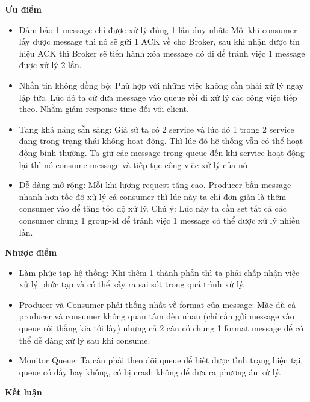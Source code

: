             \textbf{Ưu điểm}
            
            \begin{itemize}
                \item Đảm bảo 1 message chỉ được xử lý đúng 1 lần duy nhất: Mỗi khi consumer lấy được message thì nó sẽ gửi 1 ACK về cho Broker, sau khi nhận được tín hiệu ACK thì Broker sẽ tiến hành xóa message đó đi để tránh việc 1 message được xử lý 2 lần.
                \item Nhắn tin không đồng bộ: Phù hợp với những việc không cần phải xử lý ngay lập tức. Lúc đó ta cứ đưa message vào queue rồi đi xử lý các công việc tiếp theo. Nhằm giảm response time đối với client.
                \item Tăng khả năng sẵn sàng: Giả sử ta có 2 service và lúc đó 1 trong 2 service đang trong trạng thái không hoạt động. Thì lúc đó hệ thống vẫn có thể hoạt động bình thường. Ta giữ các message trong queue đến khi service hoạt động lại thì nó consume message và tiếp tục công việc xử lý của nó
                \item Dễ dàng mở rộng: Mỗi khi lượng request tăng cao. Producer bắn message nhanh hơn tốc độ xử lý cả consumer thì lúc này ta chỉ đơn giản là thêm consumer vào để tăng tốc độ xử lý. Chú ý: Lúc này ta cần set tất cả các consumer chung 1 group-id để tránh việc 1 message có thể được xử lý nhiều lần.
            \end{itemize}
            
            \textbf{Nhược điểm}
            
            \begin{itemize}
                \item Làm phức tạp hệ thống: Khi thêm 1 thành phần thì ta phải chấp nhận việc xử lý phức tạp và có thể xảy ra sai sót trong quá trình xử lý.
                \item Producer và Consumer phải thống nhất về format của message: Mặc dù cả producer và consumer không quan tâm đến nhau (chỉ cần gửi message vào queue rồi thằng kia tới lấy) nhưng cả 2 cần có chung 1 format message để có thể dễ dàng xử lý sau khi consume.
                \item Monitor Queue: Ta cần phải theo dõi queue để biết được tình trạng hiện tại, queue có đầy hay không, có bị crash không để đưa ra phương án xử lý.
            \end{itemize}
            
            \textbf{Kết luận}\\
            
